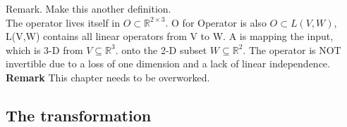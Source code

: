 \documentclass[a4paper]{article}
\begin{document}
Remark. Make this another definition.\\

The operator lives itself in $O \subset \mathbb{R}^{2\times{3}}$. O for Operator is also $O \subset L(V,W)$, L(V,W) contains all linear operators from V to W. A is mapping the input, which is 3-D from $V \subseteq \mathbb{R}^{3}$. onto the 2-D subset $W \subseteq \mathbb{R}^{2}$. The operator is NOT invertible due to a loss of one dimension and a lack of linear independence.\\



\textbf{Remark} This chapter needs to be overworked.

\subsection{The transformation}
\end{document}
